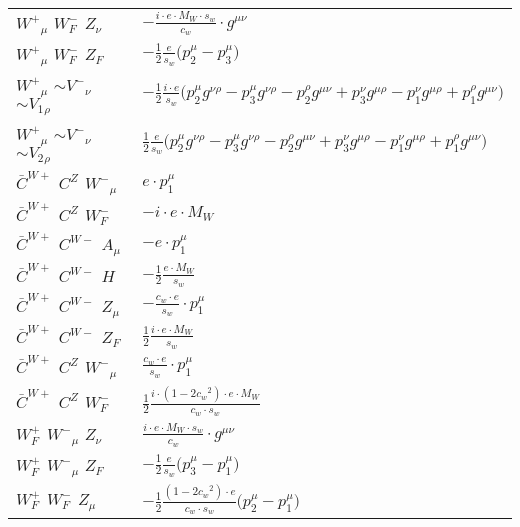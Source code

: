 \begin{center}
\begin{tabular}{|l|l|}
$W^+{}_{\mu }$ \phantom{-} $W^-_F{}_{}$ \phantom{-} ${Z}_{\nu }$ \phantom{-}  &
	$-\frac{ i \cdot e \cdot M_W \cdot s_w}{ c_w}\cdot g^{\mu \nu} $\\[2mm]
$W^+{}_{\mu }$ \phantom{-} $W^-_F{}_{}$ \phantom{-} $Z_F{}_{}$ \phantom{-}  &
	$-\frac{1}{2}\frac{ e}{ s_w}\big(p_2^\mu -p_3^\mu \big)$\\[2mm]
$W^+{}_{\mu }$ \phantom{-} $\sim V^-{}_{\nu }$ \phantom{-} $\sim V_1{}_{\rho }$ \phantom{-}  &
	$-\frac{1}{2}\frac{ i \cdot e}{ s_w}\big(p_2^\mu g^{\nu \rho} -p_3^\mu g^{\nu \rho} -p_2^\rho g^{\mu \nu} +p_3^\nu g^{\mu \rho} -p_1^\nu g^{\mu \rho} +p_1^\rho g^{\mu \nu} \big)$\\[2mm]
$W^+{}_{\mu }$ \phantom{-} $\sim V^-{}_{\nu }$ \phantom{-} $\sim V_2{}_{\rho }$ \phantom{-}  &
	$\frac{1}{2}\frac{ e}{ s_w}\big(p_2^\mu g^{\nu \rho} -p_3^\mu g^{\nu \rho} -p_2^\rho g^{\mu \nu} +p_3^\nu g^{\mu \rho} -p_1^\nu g^{\mu \rho} +p_1^\rho g^{\mu \nu} \big)$\\[2mm]
$\bar{C}^{W+}{}_{}$ \phantom{-} $C^{Z}{}_{}$ \phantom{-} $W^-{}_{\mu }$ \phantom{-}  &
	$ e\cdot p_1^\mu $\\[2mm]
$\bar{C}^{W+}{}_{}$ \phantom{-} $C^{Z}{}_{}$ \phantom{-} $W^-_F{}_{}$ \phantom{-}  &
	$- i \cdot e \cdot M_W$\\[2mm]
$\bar{C}^{W+}{}_{}$ \phantom{-} $C^{W-}{}_{}$ \phantom{-} ${A}_{\mu }$ \phantom{-}  &
	$- e\cdot p_1^\mu $\\[2mm]
$\bar{C}^{W+}{}_{}$ \phantom{-} $C^{W-}{}_{}$ \phantom{-} ${H}_{}$ \phantom{-}  &
	$-\frac{1}{2}\frac{ e \cdot M_W}{ s_w}$\\[2mm]
$\bar{C}^{W+}{}_{}$ \phantom{-} $C^{W-}{}_{}$ \phantom{-} ${Z}_{\mu }$ \phantom{-}  &
	$-\frac{ c_w \cdot e}{ s_w}\cdot p_1^\mu $\\[2mm]
$\bar{C}^{W+}{}_{}$ \phantom{-} $C^{W-}{}_{}$ \phantom{-} $Z_F{}_{}$ \phantom{-}  &
	$\frac{1}{2}\frac{ i \cdot e \cdot M_W}{ s_w}$\\[2mm]
$\bar{C}^{W+}{}_{}$ \phantom{-} $C^{Z}{}_{}$ \phantom{-} $W^-{}_{\mu }$ \phantom{-}  &
	$\frac{ c_w \cdot e}{ s_w}\cdot p_1^\mu $\\[2mm]
$\bar{C}^{W+}{}_{}$ \phantom{-} $C^{Z}{}_{}$ \phantom{-} $W^-_F{}_{}$ \phantom{-}  &
	$\frac{1}{2}\frac{ i \cdot (1-2 c_w {}^2) \cdot e \cdot M_W}{ c_w \cdot s_w}$\\[2mm]
$W^+_F{}_{}$ \phantom{-} $W^-{}_{\mu }$ \phantom{-} ${Z}_{\nu }$ \phantom{-}  &
	$\frac{ i \cdot e \cdot M_W \cdot s_w}{ c_w}\cdot g^{\mu \nu} $\\[2mm]
$W^+_F{}_{}$ \phantom{-} $W^-{}_{\mu }$ \phantom{-} $Z_F{}_{}$ \phantom{-}  &
	$-\frac{1}{2}\frac{ e}{ s_w}\big(p_3^\mu -p_1^\mu \big)$\\[2mm]
$W^+_F{}_{}$ \phantom{-} $W^-_F{}_{}$ \phantom{-} ${Z}_{\mu }$ \phantom{-}  &
	$-\frac{1}{2}\frac{ (1-2 c_w {}^2) \cdot e}{ c_w \cdot s_w}\big(p_2^\mu -p_1^\mu \big)$\\ \hline
\end{tabular}


\end{center}
